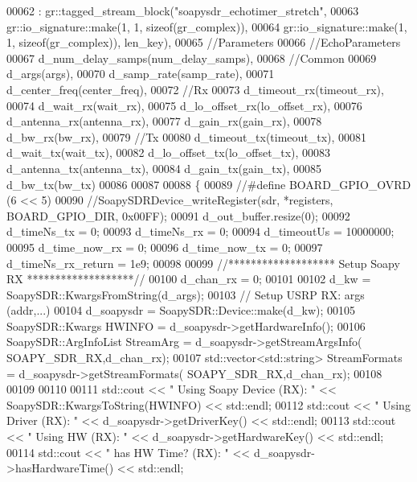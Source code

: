 \begin{DoxyCode}
00062       : gr::tagged\_stream\_block(\textcolor{stringliteral}{"soapysdr\_echotimer\_stretch"},
00063       gr::io\_signature::make(1, 1, sizeof(gr\_complex)),
00064       gr::io\_signature::make(1, 1, sizeof(gr\_complex)), len\_key),
00065       \textcolor{comment}{//Parameters}
00066         \textcolor{comment}{//EchoParameters}
00067         d\_num\_delay\_samps(num\_delay\_samps),
00068         \textcolor{comment}{//Common}
00069         d\_args(args),
00070         d\_samp\_rate(samp\_rate),
00071         d\_center\_freq(center\_freq),
00072         \textcolor{comment}{//Rx}
00073         d\_timeout\_rx(timeout\_rx),
00074         d\_wait\_rx(wait\_rx),
00075         d\_lo\_offset\_rx(lo\_offset\_rx),
00076         d\_antenna\_rx(antenna\_rx),
00077         d\_gain\_rx(gain\_rx),
00078         d\_bw\_rx(bw\_rx),
00079         \textcolor{comment}{//Tx}
00080         d\_timeout\_tx(timeout\_tx),
00081         d\_wait\_tx(wait\_tx),
00082         d\_lo\_offset\_tx(lo\_offset\_tx),
00083         d\_antenna\_tx(antenna\_tx),
00084         d\_gain\_tx(gain\_tx),
00085         d\_bw\_tx(bw\_tx)
00086 
00087 
00088     \{
00089       \textcolor{comment}{//#define BOARD\_GPIO\_OVRD (6 << 5)}
00090       \textcolor{comment}{//SoapySDRDevice\_writeRegister(sdr, *registers, BOARD\_GPIO\_DIR, 0x00FF);}
00091       d_out_buffer.resize(0);
00092       d_timeNs_tx = 0;
00093       d_timeNs_rx = 0;
00094       d_timeoutUs = 10000000;
00095       d_time_now_rx = 0;
00096       d_time_now_tx = 0;
00097       d_timeNs_rx_return = 1e9;
00098 
00099       \textcolor{comment}{//******************* Setup Soapy RX *******************//}
00100       d_chan_rx = 0;
00101 
00102       d_kw = SoapySDR::KwargsFromString(d_args);
00103       \textcolor{comment}{// Setup USRP RX: args (addr,...)}
00104       d_soapysdr = SoapySDR::Device::make(d_kw);
00105       SoapySDR::Kwargs  HWINFO = d_soapysdr->getHardwareInfo();
00106       SoapySDR::ArgInfoList StreamArg = d_soapysdr->getStreamArgsInfo(
      SOAPY_SDR_RX,d_chan_rx);
00107       std::vector<std::string> StreamFormats = d_soapysdr->getStreamFormats(
      SOAPY_SDR_RX,d_chan_rx);
00108 
00109 
00110 
00111       std::cout << \textcolor{stringliteral}{" Using Soapy Device (RX): "} << SoapySDR::KwargsToString(HWINFO) << std::endl;
00112       std::cout << \textcolor{stringliteral}{" Using Driver (RX): "} << d_soapysdr->getDriverKey() << std::endl;
00113       std::cout << \textcolor{stringliteral}{" Using HW (RX): "} << d_soapysdr->getHardwareKey() << std::endl;
00114       std::cout << \textcolor{stringliteral}{" has HW Time? (RX): "} << d_soapysdr->hasHardwareTime() << std::endl;

\end{DoxyCode}
